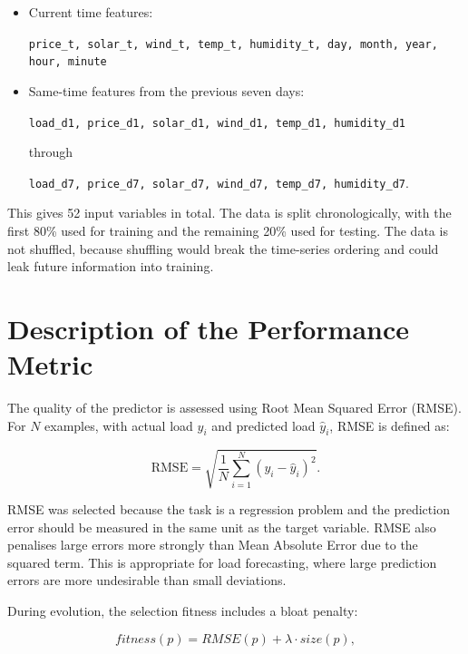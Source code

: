 \documentclass{article}
\begin{document}
\begin{itemize}
    \item Current time features:
    \begin{center}
    \texttt{price\_t, solar\_t, wind\_t, temp\_t, humidity\_t, day, month, year, hour, minute}
    \end{center}

    \item Same-time features from the previous seven days:
    \begin{center}
    \texttt{load\_d1, price\_d1, solar\_d1, wind\_d1, temp\_d1, humidity\_d1}
    \end{center}
    through
    \begin{center}
    \texttt{load\_d7, price\_d7, solar\_d7, wind\_d7, temp\_d7, humidity\_d7}.
    \end{center}
\end{itemize}

This gives 52 input variables in total. The data is split chronologically, with the first 80\% used for training and the remaining 20\% used for testing. The data is not shuffled, because shuffling would break the time-series ordering and could leak future information into training.

\section{Description of the Performance Metric}

The quality of the predictor is assessed using Root Mean Squared Error (RMSE). For $N$ examples, with actual load $y_i$ and predicted load $\hat{y}_i$, RMSE is defined as:

\begin{equation}
\text{RMSE} = \sqrt{\frac{1}{N}\sum_{i=1}^{N}(y_i - \hat{y}_i)^2}.
\end{equation}

RMSE was selected because the task is a regression problem and the prediction error should be measured in the same unit as the target variable. RMSE also penalises large errors more strongly than Mean Absolute Error due to the squared term. This is appropriate for load forecasting, where large prediction errors are more undesirable than small deviations.

During evolution, the selection fitness includes a bloat penalty:

\begin{equation}
fitness(p) = RMSE(p) + \lambda \cdot size(p),
\end{equation}
\end{document}
